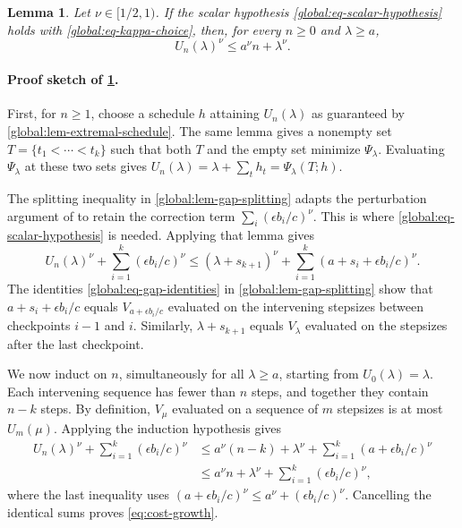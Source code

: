 \documentclass[11pt,letterpaper]{article}
\newtheorem{lemma}[lemma]{Lemma}
\theoremstyle{definition}
\begin{document}
\begin{lemma}
\label{thm:weighted-recursion}
Let $\nu\in[1/2,1)$.
If the scalar hypothesis \eqref{global:eq-scalar-hypothesis} holds with \eqref{global:eq-kappa-choice}, then, for every $n\ge0$ and $\lambda\ge a$,
\begin{equation}
  U_n(\lambda)^\nu\le a^\nu n+\lambda^\nu.
  \label{eq:cost-growth}
\end{equation}
\end{lemma}

\paragraph{Proof sketch of \cref{thm:weighted-recursion}.}
\pushQED{\qed}
First, for $n\ge1$, choose a schedule $h$ attaining $U_n(\lambda)$ as guaranteed by \cref{global:lem-extremal-schedule}.
The same lemma gives a nonempty set $T=\{t_1<\cdots<t_k\}$ such that both $T$ and the empty set minimize $\Psi_\lambda$.
Evaluating $\Psi_\lambda$ at these two sets gives $U_n(\lambda)=\lambda+\sum_t h_t=\Psi_\lambda(T;h)$.

The splitting inequality in \cref{global:lem-gap-splitting} adapts the perturbation argument of \citet[Appendix~C.6]{JungChoYun2026} to retain the correction term $\sum_i(\epsilon b_i/c)^\nu$.
This is where \eqref{global:eq-scalar-hypothesis} is needed.
Applying that lemma gives
\begin{equation}
  U_n(\lambda)^\nu+\sum_{i=1}^k(\epsilon b_i/c)^\nu
  \le(\lambda+s_{k+1})^\nu+\sum_{i=1}^k(a+s_i+\epsilon b_i/c)^\nu.
  \label{global:eq-gap-splitting}
\end{equation}
The identities \eqref{global:eq-gap-identities} in \cref{global:lem-gap-splitting} show that $a+s_i+\epsilon b_i/c$ equals $V_{a+\epsilon b_i/c}$ evaluated on the intervening stepsizes between checkpoints $i-1$ and $i$.
Similarly, $\lambda+s_{k+1}$ equals $V_\lambda$ evaluated on the stepsizes after the last checkpoint.

We now induct on $n$, simultaneously for all $\lambda\ge a$, starting from $U_0(\lambda)=\lambda$.
Each intervening sequence has fewer than $n$ steps, and together they contain $n-k$ steps.
By definition, $V_\mu$ evaluated on a sequence of $m$ stepsizes is at most $U_m(\mu)$.
Applying the induction hypothesis gives
\[
\begin{aligned}
  U_n(\lambda)^\nu+\sum_{i=1}^k(\epsilon b_i/c)^\nu
  &\le a^\nu(n-k)+\lambda^\nu+\sum_{i=1}^k(a+\epsilon b_i/c)^\nu\\
  &\le a^\nu n+\lambda^\nu+\sum_{i=1}^k(\epsilon b_i/c)^\nu,
\end{aligned}
\]
where the last inequality uses $(a+\epsilon b_i/c)^\nu\le a^\nu+(\epsilon b_i/c)^\nu$.
Cancelling the identical sums proves \eqref{eq:cost-growth}.
\popQED\\
\end{document}
